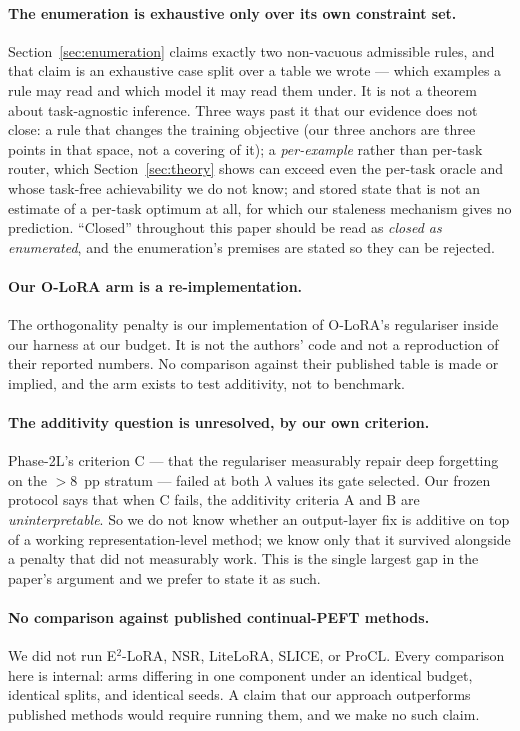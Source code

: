 \paragraph{The enumeration is exhaustive only over its own constraint set.}
Section~\ref{sec:enumeration} claims exactly two non-vacuous admissible rules, and
that claim is an exhaustive case split over a table we wrote --- which examples a
rule may read and which model it may read them under. It is not a theorem about
task-agnostic inference. Three ways past it that our evidence does not close:
a rule that changes the training objective (our three anchors are three points in
that space, not a covering of it); a \emph{per-example} rather than per-task
router, which Section~\ref{sec:theory} shows can exceed even the per-task oracle
and whose task-free achievability we do not know; and stored state that is not an
estimate of a per-task optimum at all, for which our staleness mechanism gives no
prediction. ``Closed'' throughout this paper should be read as \emph{closed as
enumerated}, and the enumeration's premises are stated so they can be rejected.

\paragraph{Our O-LoRA arm is a re-implementation.}
The orthogonality penalty is our implementation of O-LoRA's regulariser inside our
harness at our budget. It is not the authors' code and not a reproduction of their
reported numbers. No comparison against their published table is made or implied,
and the arm exists to test additivity, not to benchmark.

\paragraph{The additivity question is unresolved, by our own criterion.}
Phase-2L's criterion C --- that the regulariser measurably repair deep forgetting on
the $>8$~pp stratum --- failed at both $\lambda$ values its gate selected. Our frozen
protocol says that when C fails, the additivity criteria A and B are
\emph{uninterpretable}. So we do not know whether an output-layer fix is additive
on top of a working representation-level method; we know only that it survived
alongside a penalty that did not measurably work. This is the single largest gap in
the paper's argument and we prefer to state it as such.

\paragraph{No comparison against published continual-PEFT methods.}
We did not run E$^2$-LoRA, NSR, LiteLoRA, SLICE, or ProCL. Every comparison here is
internal: arms differing in one component under an identical budget, identical
splits, and identical seeds. A claim that our approach outperforms published methods
would require running them, and we make no such claim.

